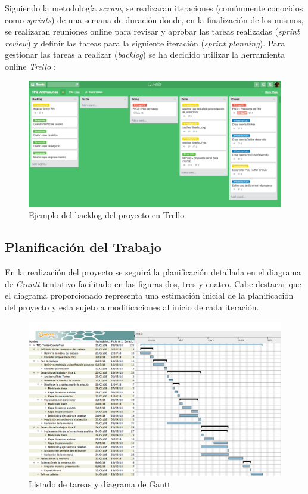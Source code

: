\documentclass[11pt,a4paper]{article}
\begin{document}
Siguiendo la metodología \textit{scrum}, se realizaran iteraciones (comúnmente conocidos como \textit{sprints}) de una semana de duración donde, en la finalización de los mismos, se realizaran reuniones online para revisar y aprobar las tareas realizadas (\textit{sprint review}) y definir las tareas para la siguiente iteración (\textit{sprint planning}). Para gestionar las tareas a realizar (\textit{backlog}) se ha decidido utilizar la herramienta online \textit{Trello} \cite{9}:

\begin{figure}[hbtp]
\centering
\includegraphics[scale=0.3]{images/trello-backlog.png}
\caption{Ejemplo del backlog del proyecto en Trello}
\end{figure}

\subsection{Planificación del Trabajo}
En la realización del proyecto se seguirá la planificación detallada en el diagrama de \textit{Grantt} tentativo facilitado en las figuras dos, tres y cuatro. Cabe destacar que el diagrama proporcionado representa una estimación inicial de la planificación del proyecto y esta sujeto a modificaciones al inicio de cada iteración.

\begin{figure}[H]
\centering
\includegraphics[scale=0.25]{planificacion.png}
\caption{Listado de tareas y diagrama de Gantt}
\end{figure}
\end{document}

